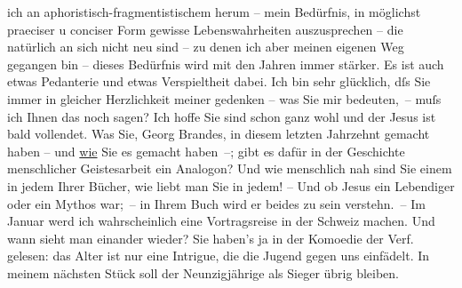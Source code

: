 \begin{ledgroupsized}[t]{13cm}
               ich an aphoristisch-fragmentistischem herum – mein Bedürfnis, in möglichst  praeciser u conciser Form gewisse Lebenswahrheiten
               auszusprechen – die natürlich an sich nicht neu sind – zu denen ich aber meinen
               eigenen Weg gegangen bin – dieses Bedürfnis wird mit den Jahren immer stärker. Es ist
               auch etwas Pedanterie und etwas Verspieltheit dabei.\pend
           \pstart
           Ich bin sehr glücklich, dſs Sie immer in gleicher Herzlichkeit meiner gedenken – was
               Sie mir bedeuten, – muſs ich Ihnen das noch sagen? Ich hoffe Sie sind schon ganz wohl
               und der Jesus ist bald vollendet. Was Sie, Georg Brandes, {\pb}in diesem letzten Jahrzehnt gemacht haben – und \uline{wie}
               Sie es gemacht haben –; gibt es dafür in der Geschichte menschlicher Geistesarbeit
               ein Analogon? Und wie menschlich nah sind Sie einem \introOben{}in\introOben{} jedem
               Ihrer Bücher, wie liebt man Sie in jedem! – Und ob Jesus ein Lebendiger oder ein Mythos war; – in Ihrem Buch wird er beides zu sein verstehn. –\pend
           \pstart
           Im Januar werd ich wahrscheinlich eine Vortragsreise in der Schweiz machen. Und wann sieht man einander wieder?
               Sie haben's ja in der Komoedie der Verf. gelesen:
               das Alter ist nur eine Intrigue, die die Jugend gegen uns einfädelt. In meinem
               nächsten Stück soll der
               Neunzigjährige als Sieger übrig bleiben.\pend
           \pstart

\end{ledgroupsized}
